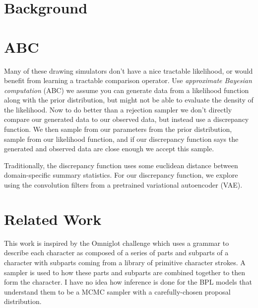 \documentclass{article}
\begin{document}
\section{Background}

\section{ABC}

Many of these drawing simulators don't have a nice tractable
likelihood, or would benefit from learning a tractable comparison
operator. Use \emph{approximate Bayesian computation} (ABC) we assume
you can generate data from a likelihood function along with the prior
distribution, but might not be able to evaluate the density of the
likelihood. Now to do better than a rejection sampler we don't
directly compare our generated data to our observed data, but instead
use a discrepancy function. We then sample from our parameters from the
prior distribution, sample from our likelihood function, and if
our discrepancy function says the generated and observed data are
close enough we accept this sample.

Traditionally, the discrepancy function uses some euclidean distance
between domain-specific summary statistics. For our discrepancy
function, we explore using the convolution filters from a pretrained
variational autoencoder (VAE).

\section{Related Work}


This work is inspired by the Omniglot challenge \citet{lake2015human}
which uses a grammar to describe each character as composed of a
series of parts and subparts of a character with subparts coming from
a library of primitive character strokes. A sampler is used to how
these parts and subparts are combined together to then form the
character. I have no idea how inference is done for the BPL models
that understand them to be a MCMC sampler with a carefully-chosen
proposal distribution.
\end{document}
